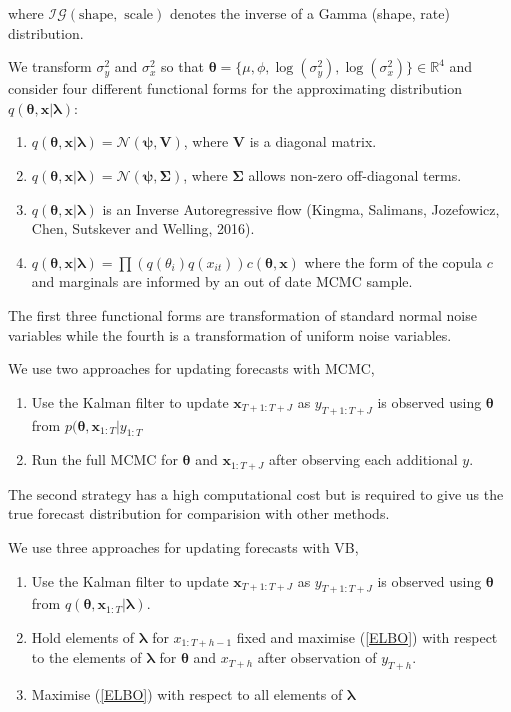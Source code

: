 \documentclass[12pt,a4paper]{article}%
\numberwithin{equation}{section}
\begin{document}
where $\mathcal{IG}(\mbox{shape}, \mbox{ scale})$ denotes the inverse of a Gamma (shape, rate) distribution.

We transform $\sigma^2_y$ and $\sigma^2_x$ so that $\boldsymbol{\theta} = \{\mu, \phi, \log(\sigma^2_y), \log(\sigma^2_x) \} \in \mathbb{R}^4$ and consider four different functional forms for the approximating distribution $q(\boldsymbol{\theta}, \textbf{x} | \boldsymbol{\lambda})$:
\begin{enumerate}
\item $q(\boldsymbol{\theta}, \textbf{x} | \boldsymbol{\lambda}) = \mathcal{N}(\boldsymbol{\psi}, \textbf{V})$, where $\textbf{V}$ is a diagonal matrix.
\item $q(\boldsymbol{\theta}, \textbf{x} | \boldsymbol{\lambda}) = \mathcal{N}(\boldsymbol{\psi}, \boldsymbol{\Sigma})$, where $\boldsymbol{\Sigma}$ allows non-zero off-diagonal terms.
\item $q(\boldsymbol{\theta}, \textbf{x} | \boldsymbol{\lambda})$ is an Inverse Autoregressive flow (Kingma, Salimans, Jozefowicz, Chen, Sutskever and Welling, 2016).
\item  $q(\boldsymbol{\theta}, \textbf{x} | \boldsymbol{\lambda}) = \prod \left(q(\theta_i) q(x_{it})\right) c(\boldsymbol{\theta}, \textbf{x})$ where the form of the copula $c$ and marginals are informed by an out of date MCMC sample.
\end{enumerate}
The first three functional forms are transformation of standard normal noise variables while the fourth is a transformation of uniform noise variables.

We use two approaches for updating forecasts with MCMC,
\begin{enumerate}
\item Use the Kalman filter to update $\textbf{x}_{T+1:T+J}$ as $y_{T+1:T+J}$ is observed using $\boldsymbol{\theta}$ from $p(\boldsymbol{\theta}, \textbf{x}_{1:T} | y_{1:T}$
\item Run the full MCMC for $\boldsymbol{\theta}$ and $\textbf{x}_{1:T+J}$ after observing each additional $y$.
\end{enumerate}
The second strategy has a high computational cost but is required to give us the true forecast distribution for comparision with other methods.

We use three approaches for updating forecasts with VB,
\begin{enumerate}
\item Use the Kalman filter to update $\textbf{x}_{T+1:T+J}$ as $y_{T+1:T+J}$ is observed using $\boldsymbol{\theta}$ from $q(\boldsymbol{\theta}, \textbf{x}_{1:T} | \boldsymbol{\lambda})$.
\item Hold elements of $\boldsymbol{\lambda}$ for $x_{1:T+h-1}$ fixed and maximise (\ref{ELBO}) with respect to the elements of $\boldsymbol{\lambda}$ for $\boldsymbol{\theta}$ and $x_{T+h}$ after observation of $y_{T+h}$.
\item Maximise (\ref{ELBO}) with respect to all elements of $\boldsymbol{\lambda}$
\end{enumerate}
\end{document}
